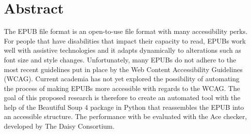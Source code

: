 \section{Abstract}
\label{sec:abstract}
The EPUB file format is an open-to-use file format with many accessibility perks. For people that have disabilities that impact their capacity to read, EPUBs work well with assistive technologies and it adapts dynamically to alterations such as font size and style changes. Unfortunately, many EPUBs do not adhere to the most recent guidelines put in place by the Web Content Accessibility Guidelines (WCAG). Current academia has not yet explored the possibility of automating the process of making EPUBs more accessible with regards to the WCAG. The goal of this proposed research is therefore to create an automated tool with the help of the Beautiful Soup 4 package in Python that reassembles the EPUB into an accessible structure. The performance with be evaluated with the Ace checker, developed by The Daisy Consortium.